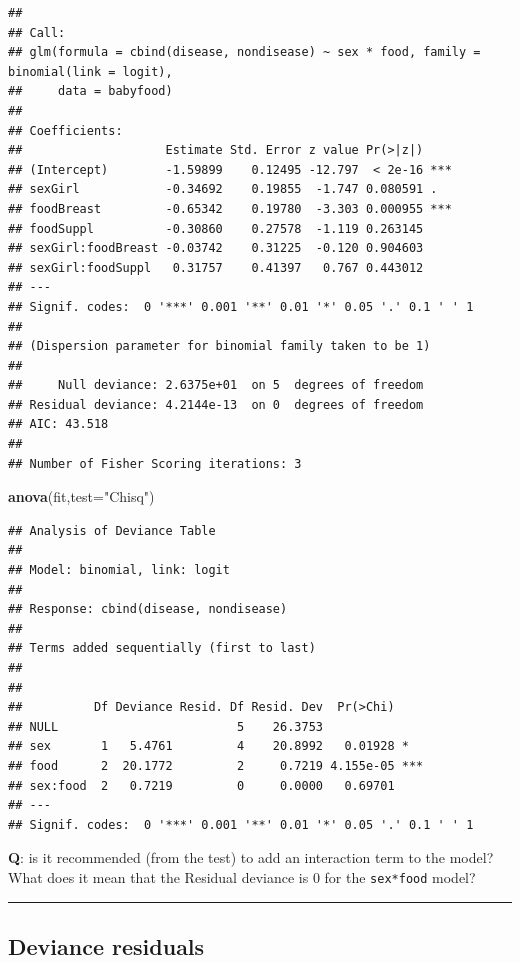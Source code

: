 \documentclass[
]{article}
\newenvironment{Shaded}{\begin{snugshade}}{\end{snugshade}}
\newcommand{\AttributeTok}[1]{\textcolor[rgb]{0.13,0.29,0.53}{#1}}
\newcommand{\FunctionTok}[1]{\textcolor[rgb]{0.13,0.29,0.53}{\textbf{#1}}}
\newcommand{\NormalTok}[1]{#1}
\newcommand{\StringTok}[1]{\textcolor[rgb]{0.31,0.60,0.02}{#1}}
\begin{document}
\begin{verbatim}
## 
## Call:
## glm(formula = cbind(disease, nondisease) ~ sex * food, family = binomial(link = logit), 
##     data = babyfood)
## 
## Coefficients:
##                    Estimate Std. Error z value Pr(>|z|)    
## (Intercept)        -1.59899    0.12495 -12.797  < 2e-16 ***
## sexGirl            -0.34692    0.19855  -1.747 0.080591 .  
## foodBreast         -0.65342    0.19780  -3.303 0.000955 ***
## foodSuppl          -0.30860    0.27578  -1.119 0.263145    
## sexGirl:foodBreast -0.03742    0.31225  -0.120 0.904603    
## sexGirl:foodSuppl   0.31757    0.41397   0.767 0.443012    
## ---
## Signif. codes:  0 '***' 0.001 '**' 0.01 '*' 0.05 '.' 0.1 ' ' 1
## 
## (Dispersion parameter for binomial family taken to be 1)
## 
##     Null deviance: 2.6375e+01  on 5  degrees of freedom
## Residual deviance: 4.2144e-13  on 0  degrees of freedom
## AIC: 43.518
## 
## Number of Fisher Scoring iterations: 3
\end{verbatim}

\begin{Shaded}
\begin{Highlighting}[]
\FunctionTok{anova}\NormalTok{(fit,}\AttributeTok{test=}\StringTok{"Chisq"}\NormalTok{)}
\end{Highlighting}
\end{Shaded}

\begin{verbatim}
## Analysis of Deviance Table
## 
## Model: binomial, link: logit
## 
## Response: cbind(disease, nondisease)
## 
## Terms added sequentially (first to last)
## 
## 
##          Df Deviance Resid. Df Resid. Dev  Pr(>Chi)    
## NULL                         5    26.3753              
## sex       1   5.4761         4    20.8992   0.01928 *  
## food      2  20.1772         2     0.7219 4.155e-05 ***
## sex:food  2   0.7219         0     0.0000   0.69701    
## ---
## Signif. codes:  0 '***' 0.001 '**' 0.01 '*' 0.05 '.' 0.1 ' ' 1
\end{verbatim}

\normalsize

\textbf{Q}: is it recommended (from the test) to add an interaction term
to the model? What does it mean that the Residual deviance is 0 for the
\texttt{sex*food} model?

\begin{center}\rule{0.5\linewidth}{0.5pt}\end{center}

\hypertarget{deviance-residuals}{%
\subsection{Deviance residuals}\label{deviance-residuals}}
\end{document}
